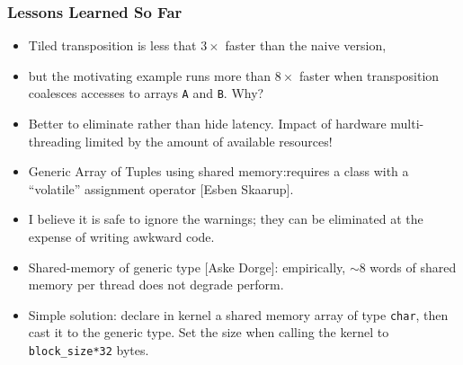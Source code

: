 \documentclass{beamer}
\newcommand{\emp}[1]{\textcolor{DikuRed}{ #1}}
\begin{document}
\begin{frame}[fragile,t]
  \frametitle{Lessons Learned So Far} 

\begin{itemize}
    \item Tiled transposition is less that $3\times$ faster
            than the naive version,
    \item but the motivating example runs more than $8\times$
            faster when transposition coalesces accesses to arrays 
            {\tt A} and {\tt B}. \alert{Why?}\pause
    \item \emp{Better to eliminate rather than hide latency.}
            Impact of hardware multi-threading limited  
            by the amount of available resources!\bigskip

    \item Generic Array of Tuples using shared memory:\pause requires a class
            with a ``volatile'' assignment operator [Esben Skaarup]. 
    \item I believe it is safe to ignore the warnings; they can be
            eliminated at the expense of writing awkward code.\bigskip

    \item Shared-memory of generic type [Aske Dorge]:\pause
            empirically, $\sim8$ words of shared memory per 
            thread does not degrade perform.
    \item Simple solution: declare in kernel a shared memory
            array of type {\tt char}, then cast it to the generic type. 
            Set the size when calling the kernel to {\tt block\_size*32} bytes.
\end  {itemize}

\end{frame}
\end{document}
